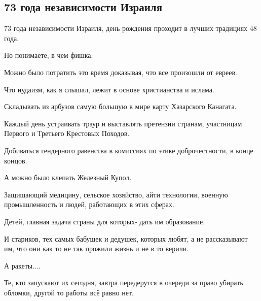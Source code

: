  
 
 
 
 
\subsection{73 года независимости Израиля}

73 года независимости Израиля, день рождения проходит в лучших традициях 48 года.

Но понимаете, в чем фишка.

Можно было потратить это время доказывая, что все произошли от евреев.

Что иудаизм, как я слышал, лежит в основе христианства и ислама.

Складывать из арбузов самую большую в мире карту Хазарского Канагата.

Каждый день устраивать траур и выставлять претензии странам, участницам Первого и Третьего Крестовых Походов.

Добиваться гендерного равенства в комиссиях по этике доброчестности, в конце концов.

А можно было клепать Железный Купол.

Защищающий медицину, сельское хозяйство, айти технологии, военную промышленность и людей, работающих в этих сферах.

Детей, главная задача страны для которых- дать им образование.

И стариков, тех самых бабушек и дедушек, которых любят, а не рассказывают им, что они как то не так прожили жизнь и не в то верили.

А ракеты....

Те, кто запускают их сегодня, завтра передерутся в очереди за право убирать обломки, другой то работы всё равно нет.
